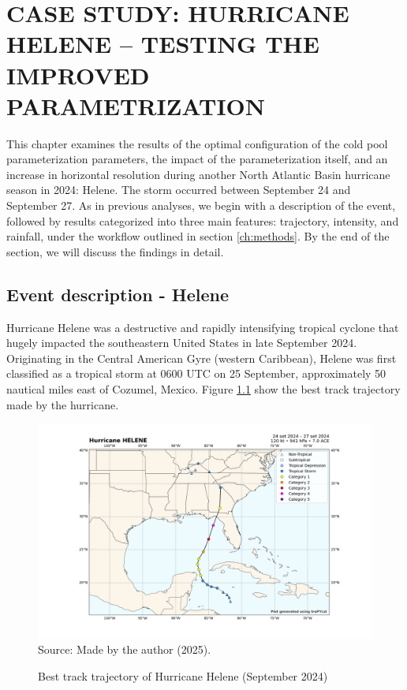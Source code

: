 \chapter{CASE STUDY: HURRICANE HELENE – TESTING THE IMPROVED PARAMETRIZATION}
\label{ch:hurricanes}
This chapter examines the results of the optimal configuration of the cold pool parameterization parameters, the impact of the parameterization itself, and an increase in horizontal resolution during another North Atlantic Basin hurricane season in 2024: Helene. The storm occurred between September 24 and September 27. As in previous analyses, we begin with a description of the event, followed by results categorized into three main features: trajectory, intensity, and rainfall, under the workflow outlined in section \ref{ch:methods}. By the end of the section, we will discuss the findings in detail.

\section{Event description - Helene}

Hurricane Helene was a destructive and rapidly intensifying tropical cyclone that hugely impacted the southeastern United States in late September 2024. Originating in the Central American Gyre (western Caribbean), Helene was first classified as a tropical storm at 0600 UTC on 25 September, approximately 50 nautical miles east of Cozumel, Mexico. Figure \ref{fig:besthelene} show the best track trajectory made by the hurricane.

\begin{figure}[!ht]
	\centering
	\caption{Best track trajectory of Hurricane Helene (September 2024)} %
	\includegraphics[width=\textwidth, trim= 10 20 10 10, clip]{docs/figuras/chapter6/Helene_2024.png} 
	\vspace{0.5em}
	Source: Made by the author (2025).  %
	\label{fig:besthelene} %
\end{figure}

